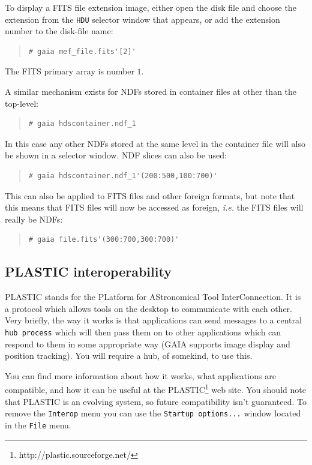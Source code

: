 \documentclass[twoside,11pt]{article}
\newcommand{\htmladdnormallinkfoot}[2]{#1\footnote{#2}}
\renewcommand{\_}{\texttt{\symbol{95}}}
\newcommand{\mytt}[1]{{\texttt{#1}}}
\begin{document}
To display a FITS file extension image, either open the disk file and
choose the extension from the \mytt{HDU} selector window that appears,
or add the extension number to the disk-file name:
\begin{quote}
\begin{verbatim}
# gaia mef_file.fits'[2]'
\end{verbatim}
\end{quote}
The FITS primary array is number $1$.

A similar mechanism exists for NDFs stored in container files at other
than the top-level:
\begin{quote}
\begin{verbatim}
# gaia hdscontainer.ndf_1
\end{verbatim}
\end{quote}
In this case any other NDFs stored at the same level in the container
file will also be shown in a selector window. NDF slices can also be
used:
\begin{quote}
\begin{verbatim}
# gaia hdscontainer.ndf_1'(200:500,100:700)'
\end{verbatim}
\end{quote}
This can also be applied to FITS files and other foreign formats, but
note that this means that FITS files will now be accessed as foreign,
\textit{i.e.} the FITS files will really be NDFs:
\begin{quote}
\begin{verbatim}
# gaia file.fits'(300:700,300:700)'
\end{verbatim}
\end{quote}

\subsection{PLASTIC interoperability}

PLASTIC stands for the PLatform for AStronomical Tool InterConnection.  It is
a protocol which allows tools on the desktop to communicate with each other.
Very briefly, the way it works is that applications can send messages to a
central \mytt{hub process} which will then pass them on to other applications
which can respond to them in some appropriate way (GAIA supports image display
and position tracking). You will require a hub, of somekind, to use this.

You can find more information about how it works, what applications
are compatible, and how it can be useful at the
\htmladdnormallinkfoot{PLASTIC}{http://plastic.sourceforge.net/} web site.
You should note that PLASTIC is an evolving system, so future compatibility
isn't guaranteed. To remove the \mytt{Interop} menu you can use the 
\mytt{Startup options...} window located in the \mytt{File} menu.
\end{document}
